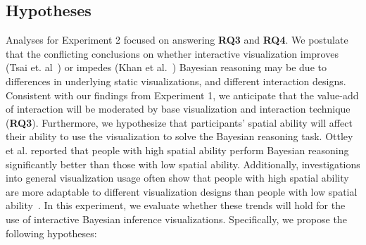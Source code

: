 \subsection{Hypotheses}
Analyses for Experiment 2 focused on answering \textbf{RQ3} and \textbf{RQ4}. We postulate that the conflicting conclusions on whether interactive visualization improves (Tsai et. al~\cite{tsai2011Interactive}) or impedes (Khan et al.~\cite{khan2018Interactive}) Bayesian reasoning may be due to differences in underlying static visualizations, and different interaction designs. Consistent with our findings from Experiment 1, we anticipate that the value-add of interaction will be moderated by base visualization and interaction technique (\textbf{RQ3}). Furthermore, %
we hypothesize that participants' spatial ability will affect their ability to use the visualization to solve the Bayesian reasoning task. Ottley et al.\cite{ottley2016Bayesian} reported that people with high spatial ability perform Bayesian reasoning significantly better than those with low spatial ability. Additionally, investigations into general visualization usage often show that people with high spatial ability are more adaptable to different visualization designs than people with low spatial ability~\cite{liu2020Survey}. In this experiment, we evaluate whether these trends will hold for the use of interactive Bayesian inference visualizations. Specifically, we propose the following hypotheses:

